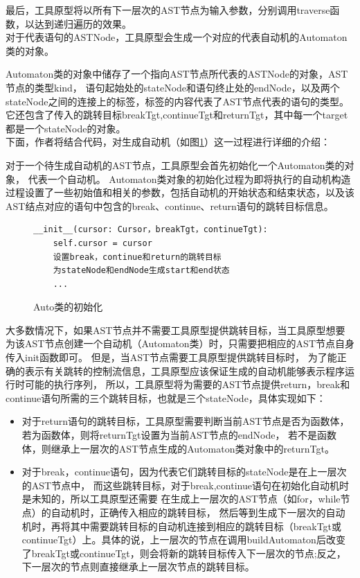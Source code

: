 最后，工具原型将以所有下一层次的AST节点为输入参数，分别调用traverse函数，以达到递归遍历的效果。\\


对于代表语句的ASTNode，工具原型会生成一个对应的代表自动机的Automaton类的对象。

Automaton类的对象中储存了一个指向AST节点所代表的ASTNode的对象，AST节点的类型kind，
语句起始处的stateNode和语句终止处的endNode，以及两个stateNode之间的连接上的标签，标签的内容代表了AST节点代表的语句的类型。
它还包含了传入的跳转目标breakTgt,continueTgt和returnTgt，其中每一个target都是一个stateNode的对象。\\

下面，作者将结合代码，对生成自动机（如图\ref{Auto类的初始化}）这一过程进行详细的介绍：

对于一个待生成自动机的AST节点，工具原型会首先初始化一个Automaton类的对象，
代表一个自动机。
Automaton类对象的初始化过程为即将执行的自动机构造过程设置了一些初始值和相关的参数，包括自动机的开始状态和结束状态，以及该AST结点对应的语句中包含的break、continue、return语句的跳转目标信息。\\
\begin{figure}[ht]
\centering
\begin{minipage}{12cm}
\begin{lstlisting}
__init__(cursor: Cursor，breakTgt，continueTgt):
    self.cursor = cursor
    设置break，continue和return的跳转目标
    为stateNode和endNode生成start和end状态
    ...
\end{lstlisting}
\end{minipage}
\caption{Auto类的初始化}
\label{Auto类的初始化}
\end{figure}

大多数情况下，如果AST节点并不需要工具原型提供跳转目标，当工具原型想要为该AST节点创建一个自动机（Automaton类）时，只需要把相应的AST节点自身传入init函数即可。
但是，当AST节点需要工具原型提供跳转目标时，
为了能正确的表示有关跳转的控制流信息，工具原型应该保证生成的自动机能够表示程序运行时可能的执行序列，
所以，工具原型将为需要的AST节点提供return，break和continue语句所需的三个跳转目标，也就是三个stateNode，具体实现如下：
\begin{itemize}
    \item 对于return语句的跳转目标，工具原型需要判断当前AST节点是否为函数体，
若为函数体，则将returnTgt设置为当前AST节点的endNode，
若不是函数体，则继承上一层次的AST节点生成的Automaton类对象中的returnTgt。
    \item 对于break，continue语句，因为代表它们跳转目标的stateNode是在上一层次的AST节点中，
而这些跳转目标，对于break,continue语句在初始化自动机时是未知的，所以工具原型还需要
在生成上一层次的AST节点（如for，while节点）的自动机时，正确传入相应的跳转目标，
然后等到生成下一层次的自动机时，再将其中需要跳转目标的自动机连接到相应的跳转目标（breakTgt或continueTgt）上。具体的说，上一层次的节点在调用buildAutomaton后改变了breakTgt或continueTgt，则会将新的跳转目标传入下一层次的节点;反之，下一层次的节点则直接继承上一层次节点的跳转目标。
\end{itemize}


